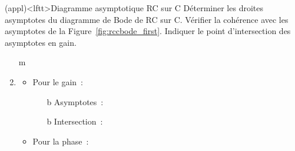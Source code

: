 \documentclass[../../main/main.tex]{subfiles}
\begin{document}
\begin{tcb*}(appl)<lftt>{Diagramme asymptotique RC sur C}
	Déterminer les droites asymptotes du diagramme de Bode de RC sur C. Vérifier
	la cohérence avec les asymptotes de la Figure~\ref{fig:rccbode_first}.
	Indiquer le point d'intersection des asymptotes en gain.
	\tcblower
	\vspace{12pt}
	\begin{enumerate}
		\item[m]
		      \psw{%
			      \[
				      \boxed{
					      \Hu(x) \Sim{x\to 0} \frac{1}{1 + 0} = 1
					      \qet
					      \Hu(x) \Sim{x\to \infty} \frac{1}{\jx}
				      }%
			      \]
		      }%
		      \vspace{-15pt}
		\item
		      \begin{itemize}
			      \item Pour le gain~:
			            \begin{itemize}
				            \item[b]{Asymptotes}~:
				            \item[b]{Intersection}~:
				                  \vspace{-25pt}
			            \end{itemize}
			      \item Pour la phase~:
			            \psw{%
				            \[
					            \f(x) \Sim{x\to 0} \arg*{1} = 0
					            \qet
					            \f(x) \Sim{x\to \infty} \arg*{\frac{1}{\jx}} = -\frac{\pi}{2}
				            \]
			            }%
			            \vspace{-15pt}
		      \end{itemize}
	\end{enumerate}
\end{tcb*}
\end{document}
